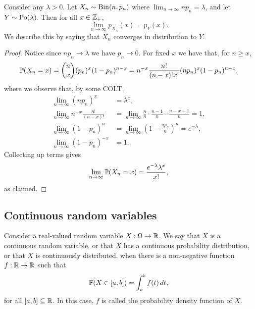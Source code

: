\documentclass[10pt, a4paper]{article}
\begin{document}
\begin{theorem}
    Consider any $\lambda > 0$. Let $X_n \sim \Bin(n, p_n)$ where $\lim_{n \rightarrow \infty} np_n = \lambda$, and let $Y \sim \Po(\lambda)$. Then for all $x \in \Z_+$,
    \[
    \lim_{n \rightarrow \infty}p_{X_n}(x) = p_Y(x).
    \]
    We describe this by saying that $X_n$ converges in distribution to $Y$.
    \begin{proof}
        Notice since $np_n \rightarrow \lambda$ we have $p_n \rightarrow 0$.
        For fixed $x$ we have that, for $n \geq x$,
        \[
        \P(X_n = x) = \binom{n}{x}(p_n) ^ x (1 - p_n) ^ {n - x} = n ^ {-x}\frac{n!}{(n - x)!x!}(np_n) ^ x (1 - p_n) ^ {n - x},
        \]
        where we observe that, by some COLT,
        \begin{align*}
            \lim_{n \rightarrow \infty} (np_n) ^ x &= \lambda ^ x, \\
            \lim_{n \rightarrow \infty} n ^ {-x} \frac{n!}{(n - x)!} &= \lim_{n \rightarrow \infty} \frac{n}{n} \cdot \frac{n - 1}{n} \dotsi \frac{n - x + 1}{n} = 1, \\
            \lim_{n \rightarrow \infty} (1 - p_n) ^ n &= \lim_{n \rightarrow \infty}\left(1 - \frac{np_n}{n}\right) ^ n = e ^ {-\lambda}, \\
            \lim_{n \rightarrow \infty} (1 - p_n) ^ {-x} &= 1.
        \end{align*}
        Collecting up terms gives
        \[
        \lim_{n \rightarrow \infty}\P(X_n = x) = \frac{e ^ {-\lambda}\lambda ^ x}{x!},
        \]
        as claimed.
    \end{proof}
\end{theorem}

\subsection{Continuous random variables}
\begin{definition}\label{pre_prob_def_crvandpdf}
Consider a real-valued random variable $X : \Omega \rightarrow \R$.
We say that $X$ is a continuous random variable,
or that $X$ has a continuous probability distribution,
or that $X$ is continuously distributed,
when there is a non-negative function $f : \R \rightarrow \R$ such that
\[
\P(X \in [a, b]) = \int_{a}^{b}f(t)\,dt,
\]
for all $[a, b] \subseteq \R$.
In this case,
$f$ is called the probability density function of $X$.
\end{definition}
\end{document}
